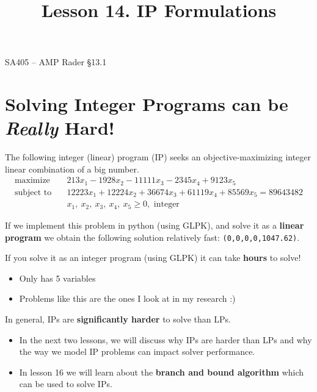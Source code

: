 \documentclass[11pt]{article}
\makeatletter
\renewcommand{\labelitemi}{$\bullet$}
\theoremstyle{definition}
\newcommand{\maximize}{\text{maximize}}
\newcommand{\subjectto}{\text{subject to}}
\renewcommand{\maketitle}{
  \noindent SA405 -- AMP \hfill Rader \S 13.1  \\

  \begin{center}\Large{\textbf{\@title}}\end{center}
}
\makeatother
\begin{document}
  
\title{Lesson 14.  IP Formulations}

\maketitle


\renewcommand\labelitemi{--}
\section{Solving Integer Programs can be \emph{Really} Hard!}

The following integer (linear) program (IP) seeks an objective-maximizing integer linear combination of a big number. 
\begin{align*}
      \maximize \quad & 213x_1 - 1928x_2 - 11111x_3 - 2345x_4 + 9123x_5
\\
      \subjectto \quad & 12223x_1 + 12224x_2 + 36674x_3 + 61119x_4 + 85569x_5 = 89643482\\
                       & x_1,~x_2,~x_3,~x_4,~x_5 \ge 0, \text{ integer }
\end{align*}

If we implement this problem in python (using GLPK), and solve it as a \textbf{linear program} we obtain the following solution relatively fast:
\verb|(0,0,0,0,1047.62)|.

If you solve it as an integer program (using GLPK) it can take \textbf{hours} to solve!

\begin{itemize}
\item Only has 5 variables
\item Problems like this are the ones I look at in my research :)
\end{itemize}

\begin{tcolorbox}
In general, IPs are \textbf{significantly harder} to solve than LPs.
\end{tcolorbox}

\begin{itemize}
\item In the next two lessons, we will discuss why IPs are harder than LPs and why the way we model IP problems can impact solver performance.
\item In lesson 16 we will learn about the \textbf{branch and bound algorithm} which can be used to solve IPs.
\end{itemize}
\end{document}
